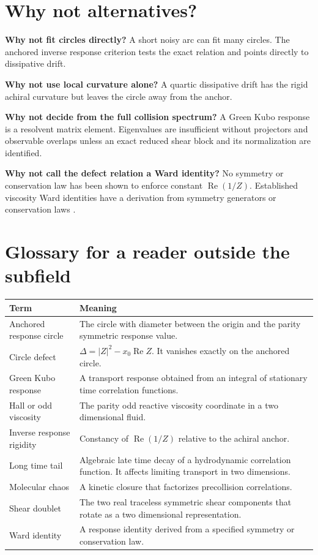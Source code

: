 \documentclass[11pt,a4paper]{article}
\newcommand{\RePart}{\operatorname{Re}}
\begin{document}
\section*{Why not alternatives?}
\textbf{Why not fit circles directly?} A short noisy arc can fit many circles. The anchored inverse response criterion tests the exact relation and points directly to dissipative drift.

\textbf{Why not use local curvature alone?} A quartic dissipative drift has the rigid achiral curvature but leaves the circle away from the anchor.

\textbf{Why not decide from the full collision spectrum?} A Green Kubo response is a resolvent matrix element. Eigenvalues are insufficient without projectors and observable overlaps unless an exact reduced shear block and its normalization are identified.

\textbf{Why not call the defect relation a Ward identity?} No symmetry or conservation law has been shown to enforce constant $\RePart(1/Z)$. Established viscosity Ward identities have a derivation from symmetry generators or conservation laws \cite{Bradlyn2012}.

\section*{Glossary for a reader outside the subfield}
\begin{longtable}{p{}p{}}
\toprule
Term & Meaning \\
\midrule
\endhead
Anchored response circle & The circle with diameter between the origin and the parity symmetric response value.\\
Circle defect & $\Delta=|Z|^2-x_0\operatorname{Re}Z$. It vanishes exactly on the anchored circle.\\
Green Kubo response & A transport response obtained from an integral of stationary time correlation functions.\\
Hall or odd viscosity & The parity odd reactive viscosity coordinate in a two dimensional fluid.\\
Inverse response rigidity & Constancy of $\operatorname{Re}(1/Z)$ relative to the achiral anchor.\\
Long time tail & Algebraic late time decay of a hydrodynamic correlation function. It affects limiting transport in two dimensions.\\
Molecular chaos & A kinetic closure that factorizes precollision correlations.\\
Shear doublet & The two real traceless symmetric shear components that rotate as a two dimensional representation.\\
Ward identity & A response identity derived from a specified symmetry or conservation law.\\
\bottomrule
\end{longtable}
\end{document}
